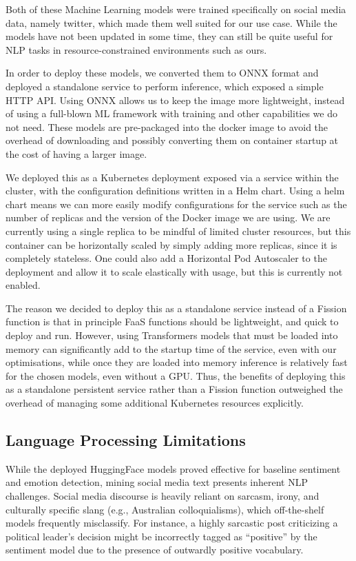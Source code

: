 Both of these Machine Learning models were trained specifically on social media data, namely twitter, which made them well suited for our use case. While the models have not been updated in some time, they can still be quite useful for NLP tasks in resource-constrained environments such as ours.

In order to deploy these models, we converted them to ONNX format and deployed a standalone service to perform inference, which exposed a simple HTTP API. Using ONNX allows us to keep the image more lightweight, instead of using a full-blown ML framework with training and other capabilities we do not need. These models are pre-packaged into the docker image to avoid the overhead of downloading and possibly converting them on container startup at the cost of having a larger image.

We deployed this as a Kubernetes deployment exposed via a service within the cluster, with the configuration definitions written in a Helm chart. Using a helm chart means we can more easily modify configurations for the service such as the number of replicas and the version of the Docker image we are using. We are currently using a single replica to be mindful of limited cluster resources, but this container can be horizontally scaled by simply adding more replicas, since it is completely stateless. One could also add a Horizontal Pod Autoscaler to the deployment and allow it to scale elastically with usage, but this is currently not enabled.

The reason we decided to deploy this as a standalone service instead of a Fission function is that in principle FaaS functions should be lightweight, and quick to deploy and run. However, using Transformers models that must be loaded into memory can significantly add to the startup time of the service, even with our optimisations, while once they are loaded into memory inference is relatively fast for the chosen models, even without a GPU. Thus, the benefits of deploying this as a standalone persistent service rather than a Fission function outweighed the overhead of managing some additional Kubernetes resources explicitly.

\subsection{Language Processing Limitations}
While the deployed HuggingFace models proved effective for baseline sentiment and emotion detection, mining social media text presents inherent NLP challenges. Social media discourse is heavily reliant on sarcasm, irony, and culturally specific slang (e.g., Australian colloquialisms), which off-the-shelf models frequently misclassify. For instance, a highly sarcastic post criticizing a political leader's decision might be incorrectly tagged as ``positive'' by the sentiment model due to the presence of outwardly positive vocabulary.

